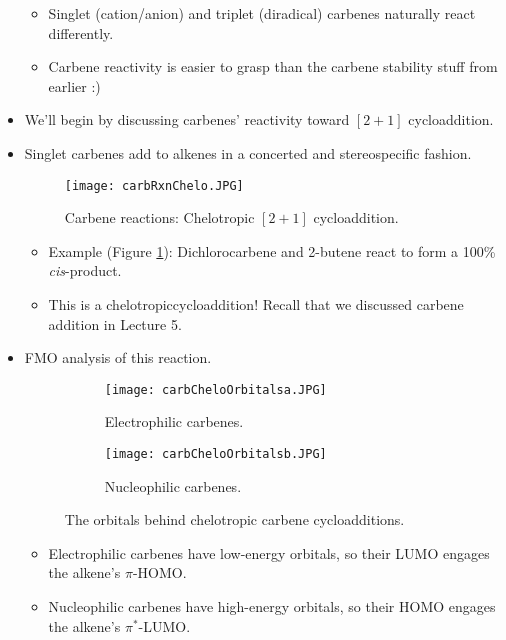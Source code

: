 \documentclass[../notes.tex]{subfiles}
\begin{document}
\begin{itemize}
\begin{itemize}
        \item Singlet (cation/anion) and triplet (diradical) carbenes naturally react differently.
        \item Carbene reactivity is easier to grasp than the carbene stability stuff from earlier :)
    \end{itemize}
    \item We'll begin by discussing carbenes' reactivity toward $[2+1]$ cycloaddition.
    \item Singlet carbenes add to alkenes in a concerted and stereospecific fashion.
    \begin{figure}[H]
        \centering
        \texttt{[image: carbRxnChelo.JPG]}
        \caption{Carbene reactions: Chelotropic $[2+1]$ cycloaddition.}
        \label{fig:carbRxnChelo}
    \end{figure}
    \begin{itemize}
        \item Example (Figure \ref{fig:carbRxnChelo}): Dichlorocarbene and 2-butene react to form a 100\% \emph{cis}-product.
        \item This is a chelotropiccycloaddition! Recall that we discussed carbene addition in Lecture 5.
    \end{itemize}
    \item FMO analysis of this reaction.
    \begin{figure}[h!]
        \centering
        \begin{subfigure}[b]{0.4\linewidth}
            \centering
            \texttt{[image: carbCheloOrbitalsa.JPG]}
            \caption{Electrophilic carbenes.}
            \label{fig:carbCheloOrbitalsa}
        \end{subfigure}
        \begin{subfigure}[b]{0.4\linewidth}
            \centering
            \texttt{[image: carbCheloOrbitalsb.JPG]}
            \caption{Nucleophilic carbenes.}
            \label{fig:carbCheloOrbitalsb}
        \end{subfigure}
        \caption{The orbitals behind chelotropic carbene cycloadditions.}
        \label{fig:carbCheloOrbitals}
    \end{figure}
    \begin{itemize}
        \item Electrophilic carbenes have low-energy orbitals, so their LUMO engages the alkene's $\pi$-HOMO.
        \item Nucleophilic carbenes have high-energy orbitals, so their HOMO engages the alkene's $\pi^*$-LUMO.

\end{itemize}
\end{itemize}
\end{document}
